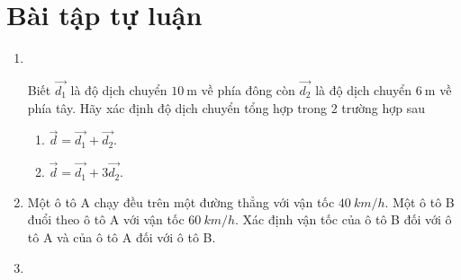 \section{Bài tập tự luận}
\begin{enumerate}[label=\bfseries Bài \arabic*:]
	\item {}\\
	{Biết $\overrightarrow{d_1}$ là độ dịch chuyển $\SI{10}{\meter}$ về phía đông còn $\overrightarrow{d_2}$ là độ dịch chuyển $\SI{6}{\meter}$ về phía tây. Hãy xác định độ dịch chuyển tổng hợp trong 2 trường hợp sau
		\begin{enumerate}[label=\alph*)]
			\item $\overrightarrow{d}=\overrightarrow{d_1}+\overrightarrow{d_2}$.
			\item $\overrightarrow{d}=\overrightarrow{d_1}+3\overrightarrow{d_2}$.
		\end{enumerate}
		
	}

	\item {}
	
	{Một ô tô A chạy đều trên một đường thẳng với vận tốc $\SI{40}{km/h}$. Một ô tô B đuổi theo ô tô A với vận tốc $\SI{60}{km/h}$. Xác định vận tốc của ô tô B đối với ô tô A và của ô tô A đối với ô tô B.}
	
	\item {}
	

\end{enumerate}
